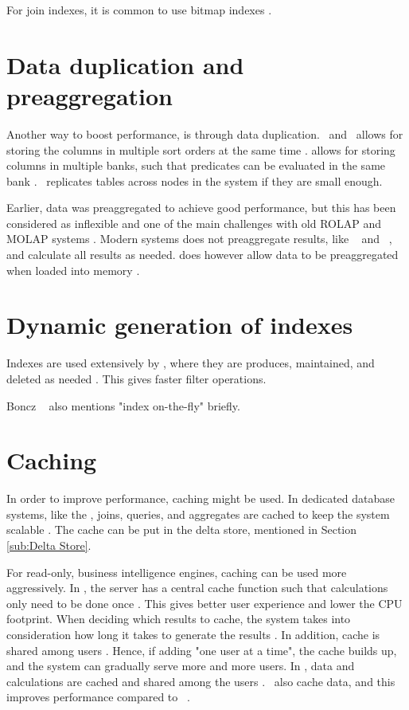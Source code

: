 For join indexes, it is common to use bitmap indexes \cite{Bjorklund2011-wh}.

\section{Data duplication and preaggregation}
\label{sec:Data duplication and preaggregation}
Another way to boost performance, is through data duplication. \cstore~and \vertica~allows for storing the columns in multiple sort orders at the same time \cite{Stonebraker2005-qz, Lamb2012-kg}. \blink allows for storing columns in multiple banks, such that predicates can be evaluated in the same bank \cite{Johnson2008-cp}. \exasol~replicates tables across nodes in the system if they are small enough.

Earlier, data was preaggregated to achieve good performance, but this has been considered as inflexible and one of the main challenges with old ROLAP and MOLAP systems \cite{Boncz2002-yj}. Modern systems does not preaggregate results, like \sapnw~\cite{Lemke2010-is} and \qlikview~\cite{Qlik2014-vd}, and calculate all results as needed. \qlikview does however allow data to be preaggregated when loaded into memory \cite{Qlik2011-yc}.

\section{Dynamic generation of indexes}
\label{sec:Dynamic generation of indexes}
Indexes are used extensively by \exasol, where they are produces, maintained, and deleted as needed \cite{Exasol2014-xh}. This gives faster filter operations.

Boncz \ea~\cite{Boncz2006-md} also mentions "index on-the-fly" briefly.

\section{Caching}
\label{sec:Caching}
In order to improve performance, caching might be used. In dedicated database systems, like the \exasol, joins, queries, and aggregates are cached to keep the system scalable \cite{Exasol2014-xh, Plattner2014-fr}. The cache can be put in the delta store, mentioned in Section \ref{sub:Delta Store}.

For read-only, business intelligence engines, caching can be used more aggressively. In \qlikview, the server has a central cache function such that calculations only need to be done once \cite{Qlik2011-ef}. This gives better user experience and lower the CPU footprint. When deciding which results to cache, the system takes into consideration how long it takes to generate the results \cite{noauthor_undateds-js}. In addition, cache is shared among users \cite{Qlik2011-yc}. Hence, if adding "one user at a time", the cache builds up, and the system can gradually serve more and more users. In \tableau, data and calculations are cached and shared among the users \cite{Kamkolkar2015-iq}. \vertipaq~also cache data, and this improves performance compared to \mssql~\cite{Ferrari2012-hm}.
